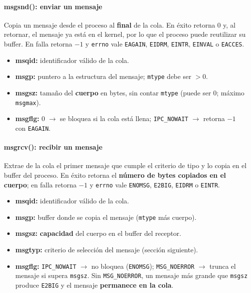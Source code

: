 \documentclass[12pt,a4paper]{article}
\begin{document}
\paragraph{msgsnd(): enviar un mensaje}
Copia un mensaje desde el proceso al \textbf{final} de la cola. En éxito retorna $0$ y, al retornar, el mensaje ya está en el kernel, por lo que el proceso puede reutilizar su buffer. En falla retorna $-1$ y \texttt{errno} vale \texttt{EAGAIN}, \texttt{EIDRM}, \texttt{EINTR}, \texttt{EINVAL} o \texttt{EACCES}.
\begin{itemize}
    \item \textbf{msqid:} identificador válido de la cola.
    \item \textbf{msgp:} puntero a la estructura del mensaje; \texttt{mtype} debe ser $> 0$.
    \item \textbf{msgsz:} tamaño del \textbf{cuerpo} en bytes, sin contar \texttt{mtype} (puede ser $0$; máximo \texttt{msgmax}).
    \item \textbf{msgflg:} $0$ $\to$ se bloquea si la cola está llena; \texttt{IPC\_NOWAIT} $\to$ retorna $-1$ con \texttt{EAGAIN}.
\end{itemize}

\paragraph{msgrcv(): recibir un mensaje}
Extrae de la cola el primer mensaje que cumple el criterio de tipo y lo copia en el buffer del proceso. En éxito retorna el \textbf{número de bytes copiados en el cuerpo}; en falla retorna $-1$ y \texttt{errno} vale \texttt{ENOMSG}, \texttt{E2BIG}, \texttt{EIDRM} o \texttt{EINTR}.
\begin{itemize}
    \item \textbf{msqid:} identificador válido de la cola.
    \item \textbf{msgp:} buffer donde se copia el mensaje (\texttt{mtype} más cuerpo).
    \item \textbf{msgsz:} \textbf{capacidad} del cuerpo en el buffer del receptor.
    \item \textbf{msgtyp:} criterio de selección del mensaje (sección siguiente).
    \item \textbf{msgflg:} \texttt{IPC\_NOWAIT} $\to$ no bloquea (\texttt{ENOMSG}); \texttt{MSG\_NOERROR} $\to$ trunca el mensaje si supera \texttt{msgsz}. Sin \texttt{MSG\_NOERROR}, un mensaje más grande que \texttt{msgsz} produce \texttt{E2BIG} y el mensaje \textbf{permanece en la cola}.
\end{itemize}
\end{document}
